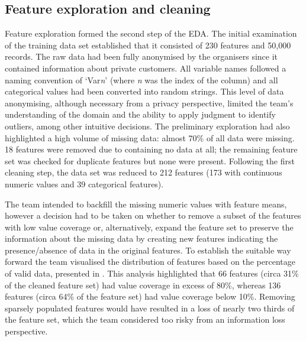 \documentclass{article}
\begin{document}
\subsection{Feature exploration and cleaning}
Feature exploration formed the second step of the EDA.
The initial examination of the training data set established that it consisted of 230 features and 50,000 records.
The raw data had been fully anonymised by the organisers since it contained information about private customers.
All variable names followed a naming convention of `Var\textit{n}' (where \textit{n} was the index of the column) and all categorical values had been converted into random strings.
This level of data anonymising, although necessary from a privacy perspective, limited the team's understanding of the domain and the ability to apply judgment to identify outliers, among other intuitive decisions.
The preliminary exploration had also highlighted a high volume of missing data: almost 70\% of all data were missing.
18 features were removed due to containing no data at all; the remaining feature set was checked for duplicate features but none were present.
Following the first cleaning step, the data set was reduced to 212 features (173 with continuous numeric values and 39 categorical features).

The team intended to backfill the missing numeric values with feature means, however a decision had to be taken on whether to remove a subset of the features with low value coverage or, alternatively, expand the feature set to preserve the information about the missing data by creating new features indicating the presence/absence of data in the original features.
To establish the suitable way forward the team visualised the distribution of features based on the percentage of valid data, presented in .
This analysis highlighted that 66 features (circa 31\% of the cleaned feature set) had value coverage in excess of 80\%, whereas 136 features (circa 64\% of the feature set) had value coverage below 10\%.
Removing sparsely populated features would have resulted in a loss of nearly two thirds of the feature set, which the team considered too risky from an information loss perspective.
\end{document}
